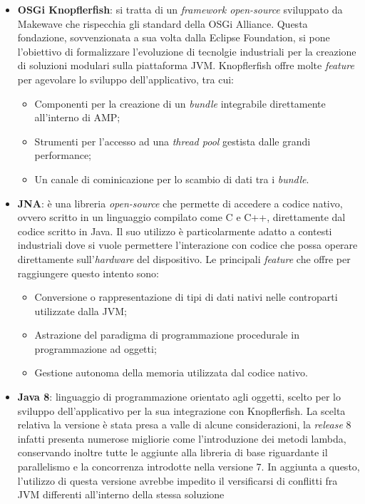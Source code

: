 \begin{itemize}
    \item \textbf{OSGi Knopflerfish}: si tratta di un \emph{framework open-source} sviluppato da Makewave che rispecchia gli standard della OSGi Alliance.
    Questa fondazione, sovvenzionata a sua volta dalla Eclipse Foundation, si pone l'obiettivo di formalizzare l'evoluzione di tecnolgie industriali per
    la creazione di soluzioni modulari sulla piattaforma JVM.
    Knopflerfish offre molte \emph{feature} per agevolare lo sviluppo dell'applicativo, tra cui:
    \begin{itemize}
        \item Componenti per la creazione di un \emph{bundle} integrabile direttamente all'interno di AMP;
        \item Strumenti per l'accesso ad una \emph{thread pool} gestista dalle grandi performance;
        \item Un canale di cominicazione per lo scambio di dati tra i \emph{bundle}.
    \end{itemize}
    \item \textbf{JNA}: è una libreria \emph{open-source} che permette di accedere a codice nativo, ovvero scritto in un linguaggio compilato come C e C++, 
    direttamente dal codice scritto in Java. Il suo utilizzo è particolarmente adatto a contesti industriali dove si vuole permettere l'interazione con
    codice che possa operare direttamente sull'\emph{hardware} del dispositivo.
    Le principali \emph{feature} che offre per raggiungere questo intento sono:
    \begin{itemize}
        \item Conversione o rappresentazione di tipi di dati nativi nelle controparti utilizzate dalla JVM;
        \item Astrazione del paradigma di programmazione procedurale in programmazione ad oggetti;
        \item Gestione autonoma della memoria utilizzata dal codice nativo.  
    \end{itemize}
    \item \textbf{Java 8}: linguaggio di programmazione orientato agli oggetti, scelto per lo sviluppo dell'applicativo per la sua integrazione con 
    Knopflerfish. La scelta relativa la versione è stata presa a valle di alcune considerazioni, la \emph{release} 8 infatti presenta numerose migliorie
    come l'introduzione dei metodi lambda, conservando inoltre tutte le aggiunte alla libreria di base riguardante il parallelismo e la concorrenza introdotte
    nella versione 7. In aggiunta a questo, l'utilizzo di questa versione avrebbe impedito il versificarsi di conflitti fra JVM differenti all'interno della
    stessa soluzione
\end{itemize}


